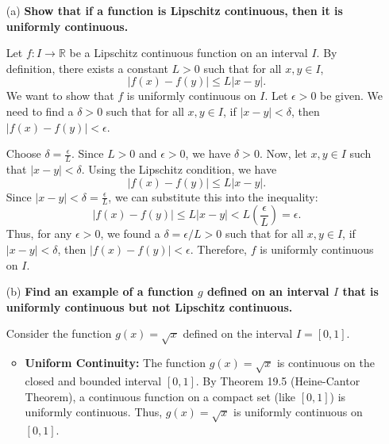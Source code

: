 \documentclass{article}
\newcommand{\R}{\mathbb{R}}
\begin{document}
\begin{enumerate}
  \item[(a)] \textbf{Show that if a function is Lipschitz continuous, then it is uniformly continuous.}

    Let \(f: I \to \R\) be a Lipschitz continuous function on an interval \(I\). By definition, there exists a constant \(L > 0\) such that for all \(x, y \in I\),
    \[ |f(x) - f(y)| \le L |x-y|. \]
    We want to show that \(f\) is uniformly continuous on \(I\). Let \(\epsilon > 0\) be given. We need to find a \(\delta > 0\) such that for all \(x, y \in I\), if \(|x-y| < \delta\), then \(|f(x) - f(y)| < \epsilon\).

    Choose \(\delta = \frac{\epsilon}{L}\). Since \(L > 0\) and \(\epsilon > 0\), we have \(\delta > 0\).
    Now, let \(x, y \in I\) such that \(|x-y| < \delta\). Using the Lipschitz condition, we have
    \[ |f(x) - f(y)| \le L |x-y|. \]
    Since \(|x-y| < \delta = \frac{\epsilon}{L}\), we can substitute this into the inequality:
    \[ |f(x) - f(y)| \le L |x-y| < L \left( \frac{\epsilon}{L} \right) = \epsilon. \]
    Thus, for any \(\epsilon > 0\), we found a \(\delta = \epsilon/L > 0\) such that for all \(x, y \in I\), if \(|x-y| < \delta\), then \(|f(x) - f(y)| < \epsilon\).
    Therefore, \(f\) is uniformly continuous on \(I\).

  \item[(b)] \textbf{Find an example of a function \(g\) defined on an interval \(I\) that is uniformly continuous but not Lipschitz continuous.}

    Consider the function \(g(x) = \sqrt{x}\) defined on the interval \(I = [0, 1]\).

    \begin{itemize}
        \item \textbf{Uniform Continuity:}
            The function \(g(x) = \sqrt{x}\) is continuous on the closed and bounded interval \([0, 1]\). By Theorem 19.5 (Heine-Cantor Theorem), a continuous function on a compact set (like \([0, 1]\)) is uniformly continuous. Thus, \(g(x) = \sqrt{x}\) is uniformly continuous on \([0, 1]\).


\end{itemize}
\end{enumerate}
\end{document}
